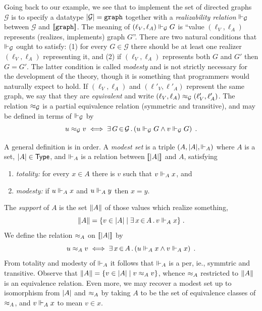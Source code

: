 Going back to our example, we see that to implement the set of
directed graphs $\mathcal{G}$ is to specify a datatype
$|\mathcal{G}| = \mathtt{graph}$ together with a
\emph{realizability relation} $\Vdash_{\mathcal{G}}$ between
$\mathcal{G}$ and $[\![\mathtt{graph}]\!]$. The meaning of
$(\ell_V, \ell_A) \Vdash_\mathcal{G} G$ is ``value $(\ell_V, \ell_A)$
represents (realizes, implements) graph $G$''. There are two natural
conditions that $\Vdash_\mathcal{G}$ ought to satisfy: (1) for every $G
\in \mathcal{G}$ there should be at least one realizer $(\ell_V,
\ell_A)$ representing it, and (2) if $(\ell_V, \ell_A)$ represents
both $G$ and $G'$ then $G = G'$. The latter condition is called
\emph{modesty} and is not strictly necessary for the development of
the theory, though it is something that programmers would naturally
expect to hold. If $(\ell_V, \ell_A)$ and $(\ell'_V, \ell'_A)$
represent the same graph, we say that they are \emph{equivalent} and
write $(\ell_V, \ell_A) \approx_\mathcal{G} (\ell'_V, \ell'_A)$. The
relation $\approx_\mathcal{G}$ is a partial equivalence relation
(symmetric and transitive), and may be defined in terms of
$\Vdash_\mathcal{G}$ by
%
\begin{equation*}
  u \approx_\mathcal{G} v
  \iff
  \exists\, G \,{\in}\, \mathcal{G}\,.\left(u \Vdash_\mathcal{G} G \land v \Vdash_\mathcal{G} G\right)
  \;.
\end{equation*}


A general definition is in order. A \emph{modest set} is a triple
$(A, |A|, {\Vdash_{A}})$ where $A$ is a set, $|A| \in \mathsf{Type}$, and
$\Vdash_A$ is a relation between $[\![|A|]\!]$ and $A$,
satisfying
% 
\begin{enumerate}
\item \emph{totality:} for every $x \in A$ there is $v$ such that $v
  \Vdash_A x$, and
\item \emph{modesty:} if $u \Vdash_A x$ and $u \Vdash_A y$ then $x = y$.
\end{enumerate}
%
The \emph{support} of $A$ is the set $\|A\|$ of those values
which realize something,
%
\begin{equation*}
  \|A\| = \{v \in |A| \mid \exists\, x \,{\in}\, A\,.\,v \Vdash_A x\} \;.
\end{equation*}
%
We define the relation $\approx_A$ on $[\![|A|]\!]$ by
%
\begin{equation*}
  u \approx_A v
  \iff
  \exists\, x \,{\in}\, A\,.\left(u \Vdash_A x \land v \Vdash_A x\right) \;.
\end{equation*}
%
From totality and modesty of $\Vdash_A$ it follows that $\Vdash_A$ is a per,
ie., symmtric and transitive. Observe that $\|A\| = \{v \in
  |A| \mid v \approx_A v\}$, whence $\approx_A$ restricted to
$\|A\|$ is an equivalence relation. Even more, we may recover a
modest set up to isomorphism from $|A|$ and $\approx_A$ by taking
$A$ to be the set of equivalence classes of $\approx_A$, and $v \Vdash_A x$
to mean $v \in x$.

